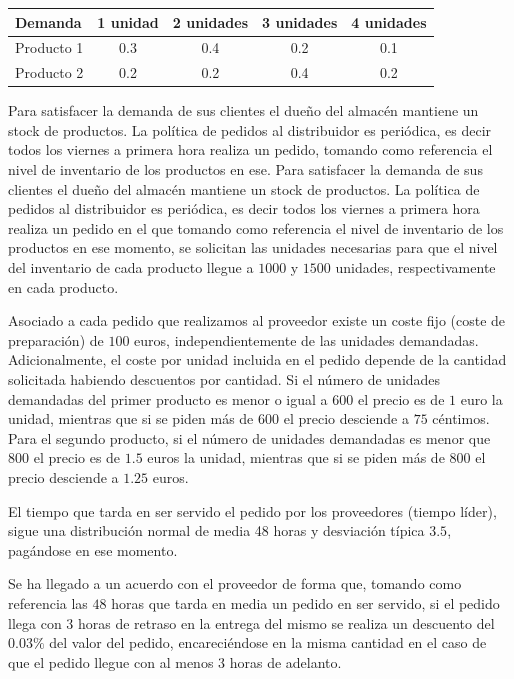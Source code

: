 \documentclass[a4paper,12pt]{article}
\begin{document}
	\begin{table}[H]
		\centering
		\begin{tabular}{|l||c|c|c|c|}
			\hline
			Demanda    & 1 unidad & 2 unidades & 3 unidades & 4 unidades \\ \hline \hline
			Producto 1 & 0.3      & 0.4        & 0.2        & 0.1        \\ \hline
			Producto 2 & 0.2      & 0.2        & 0.4        & 0.2        \\ \hline
		\end{tabular}
	\end{table}
	
	Para satisfacer la demanda de sus clientes el dueño del almacén mantiene un stock de productos. La política de pedidos al distribuidor es periódica, es decir todos los viernes a primera hora realiza un pedido, tomando como referencia el nivel de inventario de los productos en ese. Para satisfacer la demanda de sus clientes el dueño del almacén mantiene un stock de productos. La política de pedidos al distribuidor es periódica, es decir todos los viernes a primera hora realiza un pedido en el que tomando como referencia el nivel de inventario de los productos en ese momento, se solicitan las unidades necesarias para que el nivel del inventario de cada producto llegue a $1000$ y $1500$ unidades, respectivamente en cada producto.

	Asociado a cada pedido que realizamos al proveedor existe un coste fijo (coste de preparación) de $100$ euros, independientemente de las unidades demandadas. Adicionalmente, el coste por unidad incluida en el pedido depende de la cantidad solicitada habiendo descuentos por cantidad. Si el número de unidades demandadas del primer producto es menor o igual a $600$ el precio es de $1$ euro la unidad, mientras que si se piden más de $600$ el precio desciende a $75$ céntimos. Para el segundo producto, si el número de unidades demandadas es menor que $800$ el precio es de $1.5$ euros la unidad, mientras que si se piden más de $800$ el precio desciende a $1.25$ euros.

	El tiempo que tarda en ser servido el pedido por los proveedores (tiempo líder), sigue una distribución normal de media 48 horas y desviación típica $3.5$, pagándose en ese momento.

	Se ha llegado a un acuerdo con el proveedor de forma que, tomando como referencia las $48$ horas que tarda en media un pedido en ser servido, si el pedido llega con $3$ horas de retraso en la entrega del mismo se realiza un descuento del $0.03\%$ del valor del pedido, encareciéndose en la misma cantidad en el caso de que el pedido llegue con al menos $3$ horas de adelanto.
	
\end{document}
